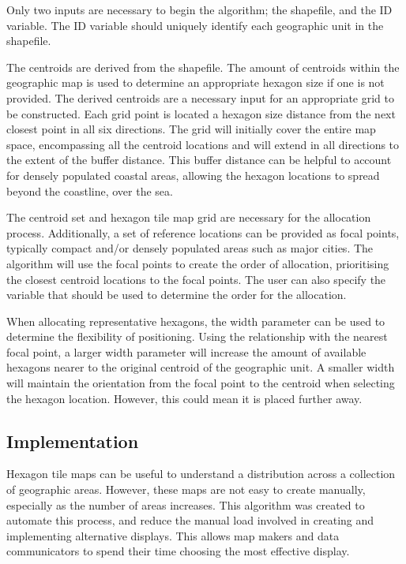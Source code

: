 Only two inputs are necessary to begin the algorithm; the shapefile, and
the ID variable. The ID variable should uniquely identify each
geographic unit in the shapefile.

The centroids are derived from the shapefile. The amount of centroids
within the geographic map is used to determine an appropriate hexagon
size if one is not provided. The derived centroids are a necessary input
for an appropriate grid to be constructed. Each grid point is located a
hexagon size distance from the next closest point in all six directions.
The grid will initially cover the entire map space, encompassing all the
centroid locations and will extend in all directions to the extent of
the buffer distance. This buffer distance can be helpful to account for
densely populated coastal areas, allowing the hexagon locations to
spread beyond the coastline, over the sea.

The centroid set and hexagon tile map grid are necessary for the
allocation process. Additionally, a set of reference locations can be
provided as focal points, typically compact and/or densely populated
areas such as major cities. The algorithm will use the focal points to
create the order of allocation, prioritising the closest centroid
locations to the focal points. The user can also specify the variable
that should be used to determine the order for the allocation.

When allocating representative hexagons, the width parameter can be used
to determine the flexibility of positioning. Using the relationship with
the nearest focal point, a larger width parameter will increase the
amount of available hexagons nearer to the original centroid of the
geographic unit. A smaller width will maintain the orientation from the
focal point to the centroid when selecting the hexagon location.
However, this could mean it is placed further away.

\hypertarget{implementation}{%
\subsection{Implementation}\label{implementation}}

Hexagon tile maps can be useful to understand a distribution across a
collection of geographic areas. However, these maps are not easy to
create manually, especially as the number of areas increases. This
algorithm was created to automate this process, and reduce the manual
load involved in creating and implementing alternative displays. This
allows map makers and data communicators to spend their time choosing
the most effective display.

